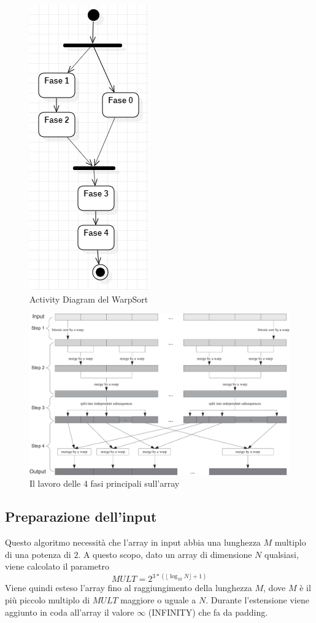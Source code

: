\documentclass[a4paper, 11pt]{article}
\begin{document}
		\begin{figure}
			\centering
			\includegraphics[width=0.3\linewidth]{img/ActivityDiagram}
			\caption{Activity Diagram del WarpSort}
			\label{fig:activitydiagram}
		\end{figure}		
		\begin{figure}
			\centering
			\includegraphics[width=0.9\linewidth]{img/fasiPrincipali}
			\caption{Il lavoro delle 4 fasi principali sull'array}
			\label{fig:fasiprincipali}
		\end{figure}
		
		\subsection{Preparazione dell'input}
			\label{preInput}
			Questo algoritmo necessità che l'array in input abbia una lunghezza $M$ multiplo di una potenza di $2$.
			A questo scopo, dato un array di dimensione $N$ qualsiasi, viene calcolato il parametro 
			$$MULT = 2^{3 * (\lfloor \log_{10} N\rfloor + 1)}$$ 
			Viene quindi esteso l'array fino al raggiungimento della lunghezza $M$, dove $M$ è il più piccolo multiplo di $MULT$ maggiore
			o uguale a $N$.
			Durante l'estensione viene aggiunto in coda all'array il valore $\infty$ (INFINITY) che fa da padding.
		
\end{document}
